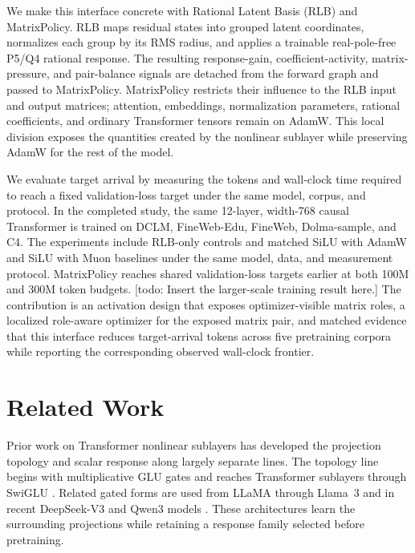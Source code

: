 \documentclass{article}
\begin{document}
We make this interface concrete with Rational Latent Basis (RLB) and
MatrixPolicy.  RLB maps residual states into grouped latent coordinates,
normalizes each group by its RMS radius, and applies a trainable real-pole-free
P5/Q4 rational response.  The resulting response-gain, coefficient-activity,
matrix-pressure, and pair-balance signals are detached from the forward graph and
passed to MatrixPolicy.  MatrixPolicy restricts their influence to the RLB input
and output matrices; attention, embeddings, normalization parameters, rational
coefficients, and ordinary Transformer tensors remain on AdamW.  This local
division exposes the quantities created by the nonlinear sublayer while
preserving AdamW for the rest of the model.

We evaluate target arrival by measuring the tokens and wall-clock time required
to reach a fixed validation-loss target under the same model, corpus, and
protocol.
In the completed study, the same 12-layer, width-768 causal Transformer is
trained on DCLM, FineWeb-Edu, FineWeb, Dolma-sample, and C4.  The experiments
include RLB-only controls and matched SiLU with AdamW and SiLU with Muon
baselines under the same model, data, and measurement protocol.  MatrixPolicy
reaches shared validation-loss targets earlier at both 100M and 300M token
budgets.  [todo: Insert the larger-scale training result here.]  The contribution
is an activation design that exposes optimizer-visible matrix roles, a localized
role-aware optimizer for the exposed matrix pair, and matched evidence that this
interface reduces target-arrival tokens across five pretraining corpora while
reporting the corresponding observed wall-clock frontier.

\section{Related Work}
\label{sec:related}

Prior work on Transformer nonlinear sublayers has developed the projection
topology and scalar response along largely separate lines.  The topology line
begins with multiplicative GLU gates and reaches Transformer sublayers through
SwiGLU \citep{dauphin2017language,shazeer2020glu}.  Related gated forms are used
from LLaMA through Llama~3 and in recent DeepSeek-V3 and Qwen3 models
\citep{touvron2023llama,grattafiori2024llama3,deepseekai2024deepseekv3,
yang2025qwen3}.  These architectures learn the surrounding projections while
retaining a response family selected before pretraining.
\end{document}
